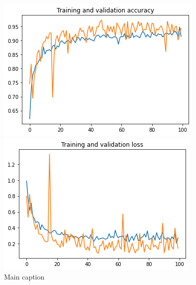 \begin{figure}[ht]
  \centering
  \begin{minipage}[b]{0.4\linewidth}
    \centering
    \includegraphics[width=\linewidth]{Chapters/Chapter_5/figures/Training_and_validation_accuracy.png}
  \end{minipage}
  \hfill
  \begin{minipage}[b]{0.4\linewidth}
    \centering
    \includegraphics[width=\linewidth]{Chapters/Chapter_5/figures/Training_and_validation_loss.png}
  \end{minipage}
  \caption{Main caption}
  \label{fig:figure5_3}
  \end{figure}
  
  
  
  
  
  
  
  